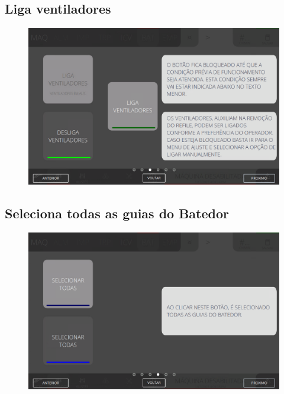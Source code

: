 \newpage
\thispagestyle{fancy}
\vspace{\fill}
\subsection{Liga ventiladores}
\begin{figure}
    \centering
    \includegraphics[width=576 px,height=360 px]{src/imagesICV/07-scout/commands/3.png}
\end{figure}

\newpage
\thispagestyle{fancy}
\vspace{\fill}
\subsection{Seleciona todas as guias do Batedor}
\begin{figure}
    \centering
    \includegraphics[width=576 px,height=360 px]{src/imagesICV/07-scout/commands/4.png}
\end{figure}

